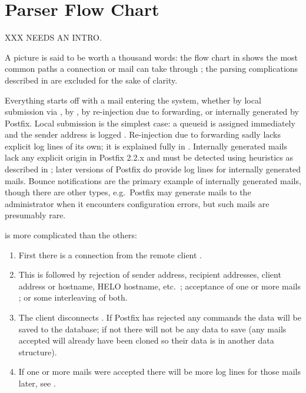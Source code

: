 \section{Parser Flow Chart}

\label{flow chart}

XXX NEEDS AN INTRO\@.

A picture is said to be worth a thousand words: the flow chart in
 shows the most common paths a connection or
mail can take through \parsername{}; the parsing complications described in
 are excluded for the sake of clarity.


Everything starts off with a mail entering the system, whether by local
submission via , by , by re-injection due to
forwarding, or internally generated by Postfix.  Local submission is the
simplest case: a queueid is assigned immediately and the sender address is
logged .  Re-injection due to forwarding sadly lacks
explicit log lines of its own; it is explained fully in
.  Internally generated mails lack any
explicit origin in Postfix 2.2.x and must be detected using heuristics as
described in ; later versions
of Postfix do provide log lines for internally generated mails.    Bounce
notifications are the primary example of internally generated mails, though
there are other types, e.g.\ Postfix may generate mails to the
administrator when it encounters configuration errors, but such mails are
presumably rare.

 is more complicated than the others:

\begin{enumerate}

    \item First there is a connection from the remote client
        .

    \item This is followed by rejection of sender address, recipient
        addresses, client  address or hostname, HELO hostname,
        etc.\ ; acceptance of one or more
        mails ; or some interleaving of both.

    \item The client disconnects .  If Postfix has
        rejected any  commands the data will be saved to the
        database; if not there will not be any data to save (any mails
        accepted will already have been cloned so their data is in another
        data structure).

    \item If one or more mails were accepted there will be more log lines
        for those mails later, see .

\end{enumerate}

